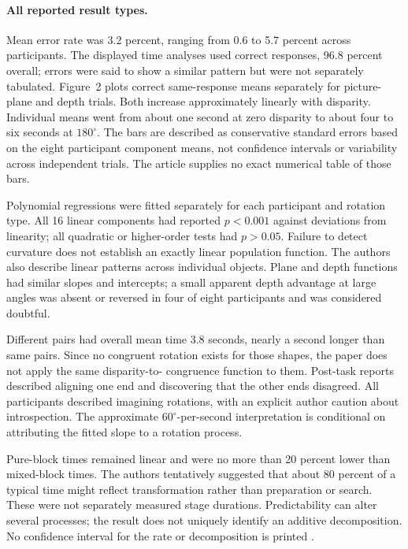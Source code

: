 \paragraph{All reported result types.}
Mean error rate was 3.2 percent, ranging from 0.6 to 5.7 percent
across participants. The displayed time analyses used correct
responses, 96.8 percent overall; errors were said to show a
similar pattern but were not separately tabulated.
Figure~2 plots correct same-response means separately for
picture-plane and depth trials. Both increase approximately
linearly with disparity. Individual means went from about
one second at zero disparity to about four to six seconds at
\(180^\circ\). The bars are described as conservative standard
errors based on the eight participant component means, not
confidence intervals or variability across independent trials.
The article supplies no exact numerical table of those bars.

Polynomial regressions were fitted separately for each participant
and rotation type. All 16 linear components had reported
\(p<0.001\) against deviations from linearity; all quadratic
or higher-order tests had \(p>0.05\). Failure to detect curvature
does not establish an exactly linear population function.
The authors also describe linear patterns across individual objects.
Plane and depth functions had similar slopes and intercepts;
a small apparent depth advantage at large angles was absent
or reversed in four of eight participants and was considered doubtful.

Different pairs had overall mean time 3.8 seconds, nearly a second
longer than same pairs. Since no congruent rotation exists for
those shapes, the paper does not apply the same disparity-to-
congruence function to them. Post-task reports described aligning
one end and discovering that the other ends disagreed.
All participants described imagining rotations, with an explicit
author caution about introspection.
The approximate \(60^\circ\)-per-second interpretation is conditional
on attributing the fitted slope to a rotation process.

Pure-block times remained linear and were no more than 20 percent
lower than mixed-block times. The authors tentatively suggested
that about 80 percent of a typical time might reflect transformation
rather than preparation or search. These were not separately
measured stage durations. Predictability can alter several processes;
the result does not uniquely identify an additive decomposition.
No confidence interval for the rate or decomposition is printed
\cite[p.~703]{ShepardMetzler1971MentalRotation}.

